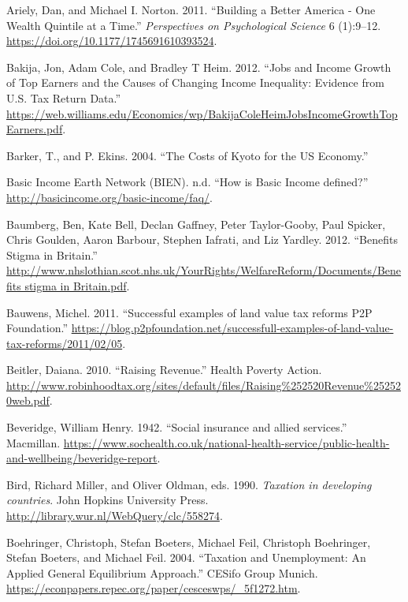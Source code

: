 \documentclass[]{tufte-handout}
\begin{document}
\leavevmode\hypertarget{ref-Norton2011}{}%
Ariely, Dan, and Michael I. Norton. 2011. ``Building a Better America -
One Wealth Quintile at a Time.'' \emph{Perspectives on Psychological
Science} 6 (1):9--12. \url{https://doi.org/10.1177/1745691610393524}.

\leavevmode\hypertarget{ref-Bakija2012}{}%
Bakija, Jon, Adam Cole, and Bradley T Heim. 2012. ``Jobs and Income
Growth of Top Earners and the Causes of Changing Income Inequality:
Evidence from U.S. Tax Return Data.''
\url{https://web.williams.edu/Economics/wp/BakijaColeHeimJobsIncomeGrowthTopEarners.pdf}.

\leavevmode\hypertarget{ref-Barker2004}{}%
Barker, T., and P. Ekins. 2004. ``The Costs of Kyoto for the US
Economy.''

\leavevmode\hypertarget{ref-BasicIncomeEarthNetworkBIEN}{}%
Basic Income Earth Network (BIEN). n.d. ``How is Basic Income defined?''
\url{http://basicincome.org/basic-income/faq/}.

\leavevmode\hypertarget{ref-Baumberg2012}{}%
Baumberg, Ben, Kate Bell, Declan Gaffney, Peter Taylor-Gooby, Paul
Spicker, Chris Goulden, Aaron Barbour, Stephen Iafrati, and Liz Yardley.
2012. ``Benefits Stigma in Britain.''
\href{http://www.nhslothian.scot.nhs.uk/YourRights/WelfareReform/Documents/Benefits\%20stigma\%20in\%20Britain.pdf}{http://www.nhslothian.scot.nhs.uk/YourRights/WelfareReform/Documents/Benefits stigma in Britain.pdf}.

\leavevmode\hypertarget{ref-Bauwens2011}{}%
Bauwens, Michel. 2011. ``Successful examples of land value tax reforms
\textbar{} P2P Foundation.''
\url{https://blog.p2pfoundation.net/successfull-examples-of-land-value-tax-reforms/2011/02/05}.

\leavevmode\hypertarget{ref-Beitler2010}{}%
Beitler, Daiana. 2010. ``Raising Revenue.'' Health Poverty Action.
\url{http://www.robinhoodtax.org/sites/default/files/Raising\%252520Revenue\%252520web.pdf}.

\leavevmode\hypertarget{ref-Beveridge1942}{}%
Beveridge, William Henry. 1942. ``Social insurance and allied
services.'' Macmillan.
\url{https://www.sochealth.co.uk/national-health-service/public-health-and-wellbeing/beveridge-report}.

\leavevmode\hypertarget{ref-BirdAndOldman}{}%
Bird, Richard Miller, and Oliver Oldman, eds. 1990. \emph{Taxation in
developing countries}. John Hopkins University Press.
\url{http://library.wur.nl/WebQuery/clc/558274}.

\leavevmode\hypertarget{ref-Boehringer2004}{}%
Boehringer, Christoph, Stefan Boeters, Michael Feil, Christoph
Boehringer, Stefan Boeters, and Michael Feil. 2004. ``Taxation and
Unemployment: An Applied General Equilibrium Approach.'' CESifo Group
Munich. \url{https://econpapers.repec.org/paper/cesceswps/_5f1272.htm}.
\end{document}
